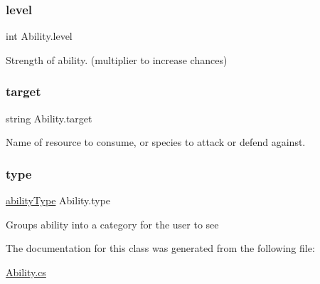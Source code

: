 \subsubsection{\texorpdfstring{level}{level}}
{\footnotesize\ttfamily int Ability.\+level}



Strength of ability. (multiplier to increase chances) 

\mbox{\label{class_ability_ab843637149d1c6cd3c0f7ee482efb083}} 
\subsubsection{\texorpdfstring{target}{target}}
{\footnotesize\ttfamily string Ability.\+target}



Name of resource to consume, or species to attack or defend against. 

\mbox{\label{class_ability_ae316cfefaa1ac41f5b24c2d1f41cceba}} 
\subsubsection{\texorpdfstring{type}{type}}
{\footnotesize\ttfamily \mbox{\hyperlink{_abilities_editor_8cs_ae01c380f385ee9eeb03333f20711ab5a}{ability\+Type}} Ability.\+type}



Groups ability into a category for the user to see 



The documentation for this class was generated from the following file\+:\begin{DoxyCompactItemize}
\item 
\mbox{\hyperlink{_ability_8cs}{Ability.\+cs}}\end{DoxyCompactItemize}
